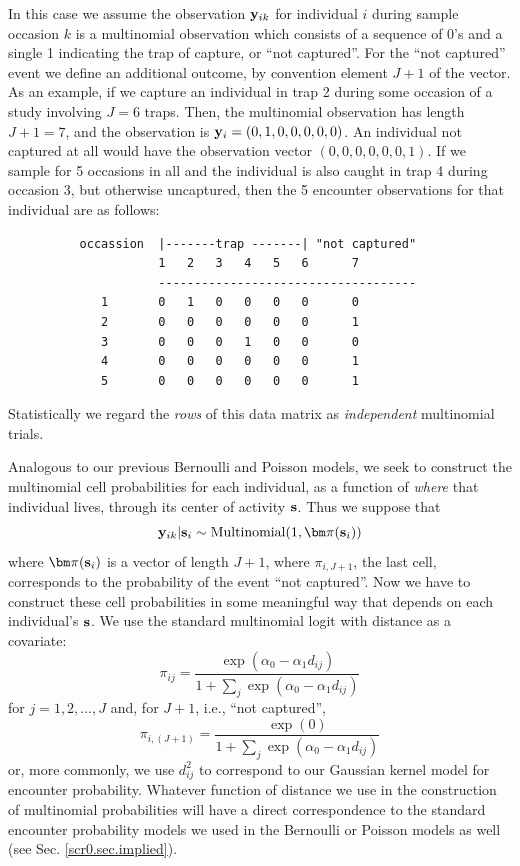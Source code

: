 In this case we assume the observation ${\bf y}_{ik}$ for individual
$i$ during sample occasion $k$ is a multinomial observation which
consists of a sequence of 0's and  a single 1 indicating the
trap of capture, or ``not captured''. For the ``not captured'' event
we define an additional outcome, by convention element $J+1$ of the
vector.  As an example, if we capture an individual in trap 2 during
some occasion of a study involving $J=6$ traps.
Then, the multinomial observation has length $J+1
= 7$, and the observation is ${\bf y}_{i} = (0,1,0,0,0,0,0)$. An
individual not captured at all would have the observation vector
$(0,0,0,0,0,0,1)$.  If we sample for 5 occasions
in all and the
individual is also caught in trap 4 during occasion 3, but otherwise
uncaptured, then the 5 encounter observations for that individual are
as follows:
\begin{verbatim}
          occassion  |-------trap -------| "not captured"
                     1   2   3   4   5   6      7
                     ------------------------------------
             1       0   1   0   0   0   0      0
             2       0   0   0   0   0   0      1
             3       0   0   0   1   0   0      0
             4       0   0   0   0   0   0      1
             5       0   0   0   0   0   0      1
\end{verbatim}
Statistically we regard the {\it rows} of this data matrix as {\it
  independent} multinomial trials.

Analogous to our previous Bernoulli and Poisson models, we seek to
construct the multinomial cell probabilities for each individual, as a
function of {\it where} that individual lives, through its center of
activity ${\bf s}$. Thus we suppose that
\begin{equation}
 {\bf y}_{ik}|{\bf s}_{i} \sim \mbox{Multinomial}(1, {\bm \pi}({\bf s}_{i}) )
\label{poisson-mn.eq.mn}
\end{equation}
where ${\bm \pi}({\bf s}_{i})$ is a vector of length $J+1$, where
$\pi_{i,J+1}$, the last cell, corresponds to the probability of the
event ``not captured''.  Now we have to construct these cell
probabilities in some meaningful way that depends on each individual's
${\bf s}$.  We use the standard multinomial logit with distance as a
covariate:
\[
 \pi_{ij} = \frac{  \exp(\alpha_{0} - \alpha_{1} d_{ij}) }{ 1+ \sum_{j}
   \exp(\alpha_{0} - \alpha_{1} d_{ij})}
\]
for $j=1,2,\ldots,J$ and, for $J+1$, i.e., ``not captured'',
\[
 \pi_{i,(J+1)} = \frac{  \exp(0) }
                    { 1+ \sum_{j} \exp(\alpha_{0} - \alpha_{1} d_{ij})}
\]
or, more commonly, we use $d_{ij}^{2}$ to correspond to our Gaussian
kernel model for encounter probability. Whatever function of distance
we use in the construction of multinomial probabilities will have a
direct correspondence to the standard encounter probability models we
used in the Bernoulli or Poisson models as well (see
Sec. \ref{scr0.sec.implied}).


